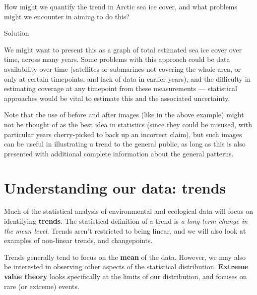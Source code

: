\documentclass[
  letterpaper,
  DIV=11,
  numbers=noendperiod]{scrartcl}
\begin{document}
\begin{tcolorbox}[enhanced jigsaw, breakable, bottomrule=.15mm, toprule=.15mm, colbacktitle=quarto-callout-tip-color!10!white, bottomtitle=1mm, arc=.35mm, opacitybacktitle=0.6, titlerule=0mm, colframe=quarto-callout-tip-color-frame, toptitle=1mm, title={Exercise 5}, rightrule=.15mm, leftrule=.75mm, left=2mm, colback=white, opacityback=0, coltitle=black]

How might we quantify the trend in Arctic sea ice cover, and what
problems might we encounter in aiming to do this?

Solution

We might want to present this as a graph of total estimated sea ice
cover over time, across many years. Some problems with this approach
could be data availability over time (satellites or submarines not
covering the whole area, or only at certain timepoints, and lack of data
in earlier years), and the difficulty in estimating coverage at any
timepoint from these measurements --- statistical approaches would be
vital to estimate this and the associated uncertainty.

Note that the use of before and after images (like in the above example)
might not be thought of as the best idea in statistics (since they could
be misused, with particular years cherry-picked to back up an incorrect
claim), but such images can be useful in illustrating a trend to the
general public, as long as this is also presented with additional
complete information about the general patterns.

\end{tcolorbox}

\section{Understanding our data:
trends}\label{understanding-our-data-trends}

Much of the statistical analysis of environmental and ecological data
will focus on identifying \textbf{trends}. The statistical definition of
a trend is \emph{a long-term change in the mean level}. Trends aren't
restricted to being linear, and we will also look at examples of
non-linear trends, and changepoints.

Trends generally tend to focus on the \textbf{mean} of the data.
However, we may also be interested in observing other aspects of the
statistical distribution. \textbf{Extreme value theory} looks
specifically at the limits of our distribution, and focuses on rare (or
extreme) events.
\end{document}
